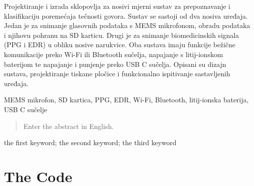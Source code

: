\documentclass[diplomskirad]{fer}
\begin{document}





\begin{sazetak}
Projektiranje i izrada sklopovlja za nosivi mjerni sustav za prepoznavanje i klasifikaciju poremećaja tečnosti govora. Sustav se sastoji od dva nosiva uređaja. Jedan je za snimanje glasovnih podataka s MEMS mikrofonom, obradu podataka i njihovu pohranu na SD karticu. Drugi je za snimanje biomedicinskih signala (PPG i EDR) u obliku nosive narukvice. Oba sustava imaju funkcije bežične komunikacije preko Wi-Fi ili Bluetooth sučelja, napajanje s litij-ionskom baterijom te napajanje i punjenje preko USB C sučelja. Opisani su dizajn sustava, projektiranje tiskane pločice i funkcionalno ispitivanje sastavljenih uređaja.
\end{sazetak}

\begin{kljucnerijeci}
MEMS mikrofon, SD kartica, PPG, EDR, Wi-Fi, Bluetooth, litij-ionska baterija, USB C sučelje
\end{kljucnerijeci}


\begin{abstract}
  Enter the abstract in English.
\end{abstract}

\begin{keywords}
  the first keyword; the second keyword; the third keyword
\end{keywords}



\backmatter

\chapter{The Code}
\end{document}
